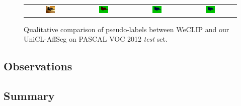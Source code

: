 \begin{figure}[ht]
\begin{tcolorbox}[colframe=black!60, colback=white, boxrule=0.8pt, arc=2pt, left=2pt, right=2pt, top=2pt, bottom=2pt]
\begin{tabular}{cccc}
      
      \includegraphics[width=0.20\textwidth,height=0.20\textwidth]
      {figures/originals/2010_002531}
                &
      \includegraphics[width=0.20\textwidth,height=0.20\textwidth]
      {figures/colored_gts/2010_002531}
                &
      \includegraphics[width=0.20\textwidth,height=0.20\textwidth]
      {figures/test_labels/weclip/2010_002531_[7, 17]}
                &
      \includegraphics[width=0.20\textwidth,height=0.20\textwidth]
      {figures/test_labels/ours/2010_002531_[7, 17]} \\


    \end{tabular}

    \caption{Qualitative comparison of pseudo-labels between WeCLIP and our UniCL-AffSeg on PASCAL VOC 2012 \textit{test} set.}
    \label{fig:qualitative_comparison_pseudolabel_test}
  \end{tcolorbox}
\end{figure}


\subsection{Observations}


\subsection{Summary}
